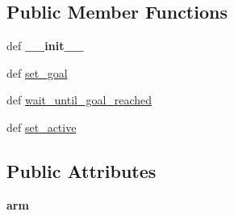 \subsection*{Public Member Functions}
\begin{DoxyCompactItemize}
\item 
\hypertarget{classaml__demos_1_1joint__sliders_1_1_dummy_controller_a51f0922fe9f58284e04f3917b7705098}{def {\bfseries \-\_\-\-\_\-init\-\_\-\-\_\-}}\label{classaml__demos_1_1joint__sliders_1_1_dummy_controller_a51f0922fe9f58284e04f3917b7705098}

\item 
def \hyperlink{classaml__demos_1_1joint__sliders_1_1_dummy_controller_a14de4cffc596b12ba39831c84250e52c}{set\-\_\-goal}
\item 
def \hyperlink{classaml__demos_1_1joint__sliders_1_1_dummy_controller_a9ea1fb1d9e7d2c5c56f9671574a5af2d}{wait\-\_\-until\-\_\-goal\-\_\-reached}
\item 
def \hyperlink{classaml__demos_1_1joint__sliders_1_1_dummy_controller_a44dbdf8cd733d1c1678344b34f637f12}{set\-\_\-active}
\end{DoxyCompactItemize}
\subsection*{Public Attributes}
\begin{DoxyCompactItemize}
\item 
\hypertarget{classaml__demos_1_1joint__sliders_1_1_dummy_controller_add6eebfa1bd6819100ec70b01933c085}{{\bfseries arm}}\label{classaml__demos_1_1joint__sliders_1_1_dummy_controller_add6eebfa1bd6819100ec70b01933c085}

\end{DoxyCompactItemize}


